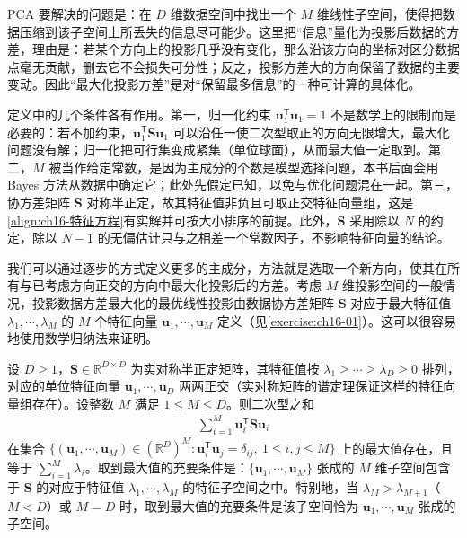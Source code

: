 \documentclass[../../main.tex]{subfiles}
\begin{document}
\begin{remark}
PCA 要解决的问题是：在 $D$ 维数据空间中找出一个 $M$ 维线性子空间，使得把数据压缩到该子空间上所丢失的信息尽可能少。这里把“信息”量化为投影后数据的方差，理由是：若某个方向上的投影几乎没有变化，那么沿该方向的坐标对区分数据点毫无贡献，删去它不会损失可分性；反之，投影方差大的方向保留了数据的主要变动。因此“最大化投影方差”是对“保留最多信息”的一种可计算的具体化。

定义中的几个条件各有作用。第一，归一化约束 $\bm{u}_1^{\mathsf T}\bm{u}_1=1$ 不是数学上的限制而是必要的：若不加约束，$\bm{u}_1^{\mathsf T}\bm{S}\bm{u}_1$ 可以沿任一使二次型取正的方向无限增大，最大化问题没有解；归一化把可行集变成紧集（单位球面），从而最大值一定取到。第二，$M$ 被当作给定常数，是因为主成分的个数是模型选择问题，本书后面会用 Bayes 方法从数据中确定它；此处先假定已知，以免与优化问题混在一起。第三，协方差矩阵 $\bm{S}$ 对称半正定，故其特征值非负且可取正交特征向量组，这是\eqref{align:ch16-特征方程}有实解并可按大小排序的前提。此外，$\bm{S}$ 采用除以 $N$ 的约定，除以 $N-1$ 的无偏估计只与之相差一个常数因子，不影响特征向量的结论。
\end{remark}

我们可以通过逐步的方式定义更多的主成分，方法就是选取一个新方向，使其在所有与已考虑方向正交的方向中最大化投影后的方差。考虑 $M$ 维投影空间的一般情况，投影数据方差最大化的最优线性投影由数据协方差矩阵 $\bm{S}$ 对应于最大特征值 $\lambda_1,\cdots,\lambda_M$ 的 $M$ 个特征向量 $\bm{u}_1,\cdots,\bm{u}_M$ 定义（见\cref{exercise:ch16-01}）。这可以很容易地使用数学归纳法来证明。

\begin{proposition}[最大方差表述的最优性]\label{proposition:ch16-最大方差}
设 $D\geqslant1$，$\bm{S}\in\mathbb{R}^{D\times D}$ 为实对称半正定矩阵，其特征值按 $\lambda_1\geqslant\cdots\geqslant\lambda_D\geqslant0$ 排列，对应的单位特征向量 $\bm{u}_1,\cdots,\bm{u}_D$ 两两正交（实对称矩阵的谱定理保证这样的特征向量组存在）。设整数 $M$ 满足 $1\leqslant M\leqslant D$。则二次型之和
\begin{align*}
  \sum_{i=1}^{M}\bm{u}_i^{\mathsf T}\bm{S}\bm{u}_i
\end{align*}
在集合 $\{(\bm{u}_1,\cdots,\bm{u}_M)\in(\mathbb{R}^{D})^{M}:\bm{u}_i^{\mathsf T}\bm{u}_j=\delta_{ij},\ 1\leqslant i,j\leqslant M\}$ 上的最大值存在，且等于 $\sum_{i=1}^{M}\lambda_i$。取到最大值的充要条件是：$\{\bm{u}_1,\cdots,\bm{u}_M\}$ 张成的 $M$ 维子空间包含于 $\bm{S}$ 的对应于特征值 $\lambda_1,\cdots,\lambda_M$ 的特征子空间之中。特别地，当 $\lambda_M>\lambda_{M+1}$（$M<D$）或 $M=D$ 时，取到最大值的充要条件是该子空间恰为 $\bm{u}_1,\cdots,\bm{u}_M$ 张成的子空间。
\end{proposition}
\end{document}
